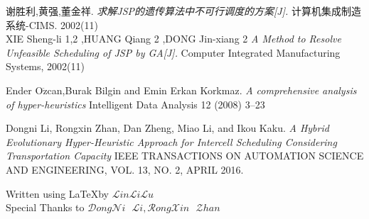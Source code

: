 \documentclass[UTF8]{ctexart}
\begin{document}
\begin{thebibliography}{9}
谢胜利,黄强,董金祥.
\textit{求解JSP的遗传算法中不可行调度的方案[J].}
计算机集成制造系统-CIMS. 2002(11)\\
XIE Sheng-li 1,2 ,HUANG Qiang 2 ,DONG Jin-xiang 2
\textit{A Method to Resolve Unfeasible Scheduling of JSP by GA[J].}
Computer Integrated Manufacturing Systems, 2002(11)

Ender O$\ddot{\mathrm{z}}$can,Burak Bilgin and Emin Erkan Korkmaz.
\textit{A comprehensive analysis of hyper-heuristics}
Intelligent Data Analysis 12 (2008) 3–23

Dongni Li, Rongxin Zhan, Dan Zheng, Miao Li, and Ikou Kaku.
\textit{A Hybrid Evolutionary Hyper-Heuristic Approach for Intercell Scheduling Considering Transportation Capacity}
IEEE TRANSACTIONS ON AUTOMATION SCIENCE AND ENGINEERING, VOL. 13, NO. 2, APRIL 2016.
\end{thebibliography}
Written using \LaTeX \space by $\mathcal{L}in\mathcal{L}i\mathcal{L}u$\\

Special Thanks to $\mathcal{D}ong\mathcal{N}i\text{ }\mathcal{L}i, \mathcal{R}ong \mathcal{X}in \text{ }\mathcal{Z}han$
\end{document}
